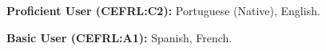 

\begin{cventries}

  \cventry
    {}
    {}
    {}
    {} 
    {
	  \vspace{-1.0cm}
      \begin{cvitems} %
        \item[] {\hspace{-.31cm}\textbf{Proficient User (CEFRL:C2):} Portuguese (Native), English.}
        \item[] {\hspace{-.31cm}\textbf{Basic User (CEFRL:A1):} Spanish, French.}
      \end{cvitems}
    }

\end{cventries}
